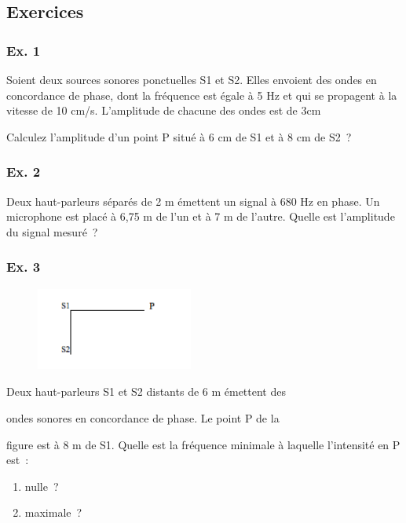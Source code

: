 {\subsection{Exercices}

\subsubsection{Ex. 1}

Soient deux sources sonores ponctuelles S1 et S2. Elles envoient des
ondes en concordance de phase, dont la fréquence est égale à 5 Hz et qui
se propagent à la vitesse de 10 cm/s. L'amplitude de chacune des ondes
est de 3cm

Calculez l'amplitude d'un point P situé à 6 cm de S1 et à 8 cm de S2~?

\subsubsection{Ex. 2}

Deux haut-parleurs séparés de 2 m émettent un signal à 680 Hz en phase.
Un microphone est placé à 6,75 m de l'un et à 7 m de l'autre. Quelle est
l'amplitude du signal mesuré~?

\subsubsection{Ex. 3}

\begin{figure}
\centering
\includegraphics[width=5.151cm,height=2.729cm]{Pictures/10000001000000BC000000630AF71C86AA2A0A65.png}
\caption{}
\end{figure}

Deux haut-parleurs S1 et S2 distants de 6 m émettent des

ondes sonores en concordance de phase. Le point P de la

figure est à 8 m de S1. Quelle est la fréquence minimale
à laquelle l'intensité en P est~:

\begin{enumerate}
\item nulle~?
\item  maximale~?
\end{enumerate}

}
